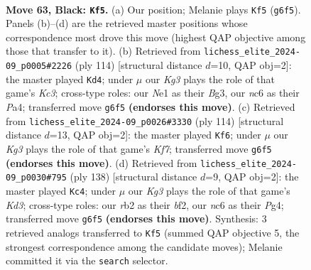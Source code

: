 \documentclass[11pt]{article}
\begin{document}
\clearpage

\begin{figure}[p]\centering
\begin{subfigure}{0.46\textwidth}\centering
\resizebox{\linewidth}{!}{%
\newchessgame
\chessboard[
  setfen={8/8/2Np2k1/8/7p/6p1/1R6/4n2K b - - 1 63},
  showmover=false,
  pgfstyle=straightmove, color=movearrow, markmove={g6-f5}
]}
\caption{}
\end{subfigure}\hfill
\begin{subfigure}{0.46\textwidth}\centering
\resizebox{\linewidth}{!}{%
\newchessgame
\chessboard[
  setfen={8/3k4/p7/3P4/P3P3/2K3B1/8/8 w - - 1 58},
  showmover=false,
  pgfstyle=straightmove, color=movearrow, markmove={c3-d4}
]}
\caption{}
\end{subfigure}
\\[4pt]
\begin{subfigure}{0.46\textwidth}\centering
\resizebox{\linewidth}{!}{%
\newchessgame
\chessboard[
  setfen={7k/5K2/7P/6P1/8/8/1p6/1N6 w - - 1 58},
  showmover=false,
  pgfstyle=straightmove, color=movearrow, markmove={f7-f6}
]}
\caption{}
\end{subfigure}\hfill
\begin{subfigure}{0.46\textwidth}\centering
\resizebox{\linewidth}{!}{%
\newchessgame
\chessboard[
  setfen={8/1N6/4k1p1/1P6/P5P1/3K4/5b2/8 w - - 1 70},
  showmover=false,
  pgfstyle=straightmove, color=movearrow, markmove={d3-c4}
]}
\caption{}
\end{subfigure}
\caption{\textbf{Move 63, Black: \texttt{Kf5}.} (a) Our position; Melanie plays \texttt{Kf5} (\texttt{g6f5}). Panels (b)--(d) are the retrieved master positions whose correspondence most drove this move (highest QAP objective among those that transfer to it). (b) Retrieved from \texttt{lichess\_elite\_2024-09\_p0005\#2226} (ply 114) [structural distance $d$=10, QAP obj=2]: the master played \texttt{Kd4}; under $\mu$ our \emph{Kg3} plays the role of that game's \emph{Kc3}; cross-type roles: our \emph{N}e1 as their \emph{B}g3, our \emph{n}c6 as their \emph{P}a4; transferred move \texttt{g6f5} \textbf{(endorses this move)}. (c) Retrieved from \texttt{lichess\_elite\_2024-09\_p0026\#3330} (ply 114) [structural distance $d$=13, QAP obj=2]: the master played \texttt{Kf6}; under $\mu$ our \emph{Kg3} plays the role of that game's \emph{Kf7}; transferred move \texttt{g6f5} \textbf{(endorses this move)}. (d) Retrieved from \texttt{lichess\_elite\_2024-09\_p0030\#795} (ply 138) [structural distance $d$=9, QAP obj=2]: the master played \texttt{Kc4}; under $\mu$ our \emph{Kg3} plays the role of that game's \emph{Kd3}; cross-type roles: our \emph{r}b2 as their \emph{b}f2, our \emph{n}c6 as their \emph{P}g4; transferred move \texttt{g6f5} \textbf{(endorses this move)}. Synthesis: 3 retrieved analogs transferred to \texttt{Kf5} (summed QAP objective 5, the strongest correspondence among the candidate moves); Melanie committed it via the \texttt{search} selector.}
\label{fig:thought-m125}
\end{figure}
\end{document}
